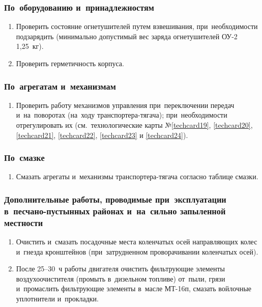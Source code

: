 \subsubsection{По~оборудованию и~принадлежностям}
\begin{enumerate}
    \item Проверить состояние огнетушителей путем взвешивания, при~необходимости подзарядить (минимально допустимый вес заряда огнетушителей ОУ-2 1,25~кг). 
    \item Проверить герметичность корпуса.
\end{enumerate}

\subsubsection{По~агрегатам и~механизмам}
\begin{enumerate}
    \item Проверить работу механизмов управления при~переключении передач и~на~поворотах (на~ходу транспортера-тягача); при~необходимости отрегулировать их (см.~технологические карты №\ref{techcard19}, \ref{techcard20}, \ref{techcard21}, \ref{techcard22}, \ref{techcard23} и \ref{techcard24}). 
\end{enumerate}

\subsubsection{По~смазке}
\begin{enumerate}
    \item Смазать агрегаты и~механизмы транспортера-тягача согласно таблице смазки.
\end{enumerate}

\subsubsection{Дополнительные работы, проводимые при~эксплуатации в~песчано-пустынных районах и~на~сильно запыленной местности}
\begin{enumerate}
    \item Очистить и~смазать посадочные места коленчатых осей направляющих колес и~гнезда кронштейнов (при~затрудненном проворачивании коленчатых осей). 
    \item После 25--30~ч работы двигателя очистить фильтрующие элементы воздухоочистителя (промыть в~дизельном топливе) от~пыли, грязи и~промаслить фильтрующие элементы в~масле МТ-16п, смазать войлочные уплотнители и~прокладки.
\end{enumerate}


